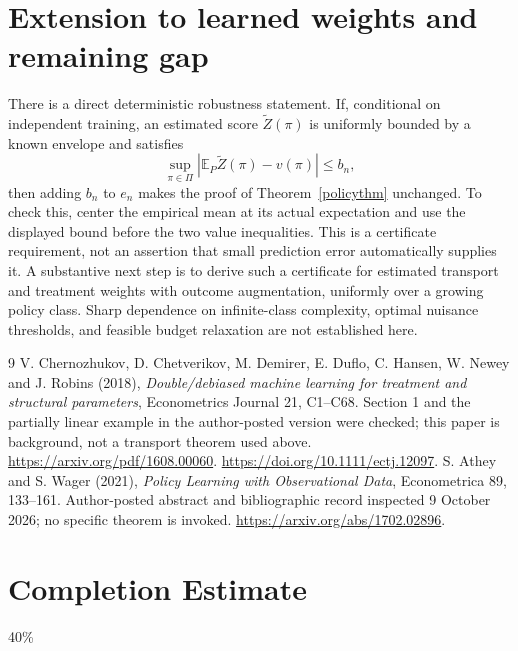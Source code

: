 \documentclass[11pt]{article}
\theoremstyle{remark}
\newcommand{\E}{\mathbb E}
\begin{document}
\section{Extension to learned weights and remaining gap}
There is a direct deterministic robustness statement. If, conditional on independent training, an estimated score $\widetilde Z(\pi)$ is uniformly bounded by a known envelope and satisfies
\[
 \sup_{\pi\in\Pi}|\E_P\widetilde Z(\pi)-v(\pi)|\leq b_n,
\]
then adding $b_n$ to $e_n$ makes the proof of Theorem~\ref{policythm} unchanged. To check this, center the empirical mean at its actual expectation and use the displayed bound before the two value inequalities. This is a certificate requirement, not an assertion that small prediction error automatically supplies it. A substantive next step is to derive such a certificate for estimated transport and treatment weights with outcome augmentation, uniformly over a growing policy class. Sharp dependence on infinite-class complexity, optimal nuisance thresholds, and feasible budget relaxation are not established here.

\begin{thebibliography}{9}
 V. Chernozhukov, D. Chetverikov, M. Demirer, E. Duflo, C. Hansen, W. Newey and J. Robins (2018), \emph{Double/debiased machine learning for treatment and structural parameters}, Econometrics Journal 21, C1--C68. Section 1 and the partially linear example in the author-posted version were checked; this paper is background, not a transport theorem used above. \url{https://arxiv.org/pdf/1608.00060}. \url{https://doi.org/10.1111/ectj.12097}.
 S. Athey and S. Wager (2021), \emph{Policy Learning with Observational Data}, Econometrica 89, 133--161. Author-posted abstract and bibliographic record inspected 9 October 2026; no specific theorem is invoked. \url{https://arxiv.org/abs/1702.02896}.
\end{thebibliography}

\section{Completion Estimate}
40\%
\end{document}
